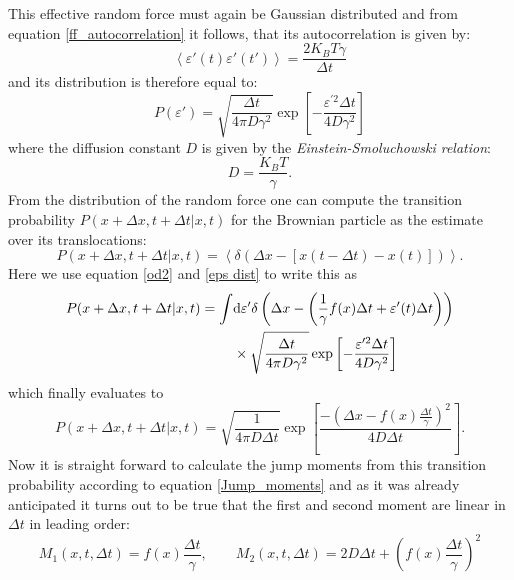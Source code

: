 This effective random force must again be Gaussian distributed and from equation \eqref{ff_autocorrelation} it follows, that its autocorrelation is given by:
\begin{equation}
    \left< \varepsilon'(t) \varepsilon'(t') \right> = \frac{2 K_B T \gamma}{ \Delta t}
    \label{ff_eff_autocorrelation}
\end{equation}
and its distribution is therefore equal to:
\begin{equation}
    P(\varepsilon ' ) = \sqrt{\frac{\Delta t}{4 \pi D \gamma^{2}}} \exp \left[ - \frac{\varepsilon ^{\prime 2} \Delta t}{4 D \gamma^{2}} \right]
    \label{eps dist}
\end{equation}
where the diffusion constant $D$ is given by the \emph{Einstein-Smoluchowski relation}:
\begin{equation}
    D = \frac{K_B T}{\gamma}.
    \label{ESR}
\end{equation}
From the distribution of the random force one can compute the transition probability $P(x+\Delta x, t+ \Delta t| x, t)$ for the Brownian particle as the estimate over its translocations:
\begin{equation}
    P(x+\Delta x,t+\Delta t|x,t)  = \left< \delta \left(  \Delta x - \left[x(t-\Delta t) - x(t)\right] \right)\right>.
\end{equation}
Here we use equation \eqref{od2} and \eqref{eps dist} to write this as
\begin{align}
     P(x+\Delta x,t+\Delta t|x,t) = \int & {\rm d}\varepsilon '  \delta  \left(  \Delta x - \left( \frac{1}{\gamma} f(x) \Delta t + \varepsilon'(t) \Delta t \right) \right) \nonumber \\ 
     & \times \sqrt{\frac{\Delta t}{4 \pi D \gamma^{2}}} \exp \left[ - \frac{\varepsilon  ^{\prime 2} \Delta t}{4 D \gamma^{2}} \right]
 \end{align}
 which finally evaluates to 
 \begin{equation}
      P(x+\Delta x,t+\Delta t|x,t) = \sqrt{\frac{1}{4 \pi D \Delta t}} \exp \left[ \frac{-\left(\Delta x - f(x) \frac{\Delta t}{\gamma} \right)^2}{4 D \Delta t} \right].
    \label{BM_transition_probability}
\end{equation}
Now it is straight forward to calculate the jump moments from this transition probability according to equation \eqref{Jump_moments} and as it was already anticipated it turns out to be true that the first and second moment are linear in $\Delta t$ in leading order: 
\begin{equation}
    M_1(x,t,\Delta t) = f(x)\frac{\Delta t}{\gamma}, \qquad M_2(x,t,\Delta t) = 2 D \Delta t + \left(f(x)\frac{\Delta t}{\gamma} \right)^{2}
    \label{BM_jump_moments}
\end{equation}
